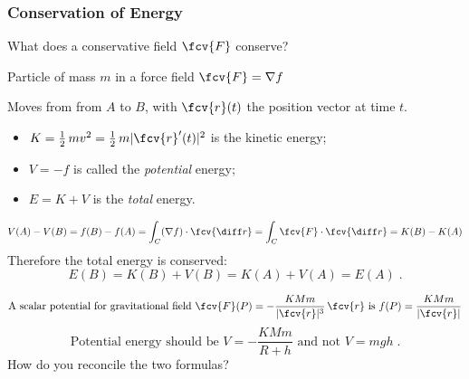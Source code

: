\begin{frame}
\small
  \frametitle{Conservation of Energy}

  What does a conservative field $\fcv{F}$ conserve?

  \pause Particle of mass $m$ in a force field $\fcv{F} = \nabla f$

  \pause Moves from from $A$ to $B$, with $\fcv{r}(t)$ the position vector at time $t$.

  \begin{itemize}
    \item \pause $K = \frac{1}{2}\, mv^2 = \frac{1}{2}\, m|\fcv{r}'(t)|^2$ is the kinetic energy;
    \item \pause $V=-f$ is called the \emph{potential} energy;
    \item \pause $E=K+V$ is the
\emph{total} energy.
  \end{itemize}
  $$V(A)-V(B) = f(B) - f(A) = \int_C (\nabla f) \cdot \fcv{\diff r} = \int_C \fcv{F} \cdot \fcv{\diff r} = K(B)-K(A)$$
  \pause Therefore the total energy is conserved:
  $$E(B) = K(B)+V(B) = K(A)+V(A) = E(A)\; .$$

\pause
%
$$\text{A scalar potential for gravitational field } \fcv{F}(P) = -\frac{KMm}{|\fcv{r}|^3}\, \fcv{r} \text{ is } f(P) = \frac{KMm}{|\fcv{r}|}  $$
%
$$\text{Potential energy should be } V = -\frac{KMm}{R+h} \text{ and not } V = mgh\; .$$
\pause How do you reconcile the two formulas?
\end{frame}